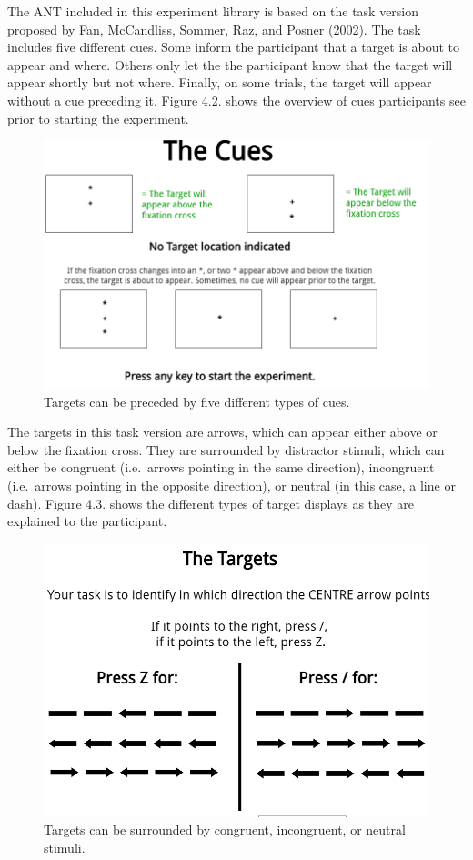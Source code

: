 \documentclass[
]{book}
\begin{document}
The ANT included in this experiment library is based on the task version proposed by Fan, McCandliss, Sommer, Raz, and Posner (2002). The task includes five different cues. Some inform the participant that a target is about to appear and where. Others only let the the participant know that the target will appear shortly but not where. Finally, on some trials, the target will appear without a cue preceding it. Figure 4.2. shows the overview of cues participants see prior to starting the experiment.

\begin{figure}

{\centering \includegraphics[width=0.8\linewidth]{images/ANT_Cues} 

}

\caption{Targets can be preceded by five different types of cues.}\label{fig:Figure3-2}
\end{figure}

The targets in this task version are arrows, which can appear either above or below the fixation cross. They are surrounded by distractor stimuli, which can either be congruent (i.e.~arrows pointing in the same direction), incongruent (i.e.~arrows pointing in the opposite direction), or neutral (in this case, a line or dash). Figure 4.3. shows the different types of target displays as they are explained to the participant.

\begin{figure}

{\centering \includegraphics[width=0.8\linewidth]{images/ANT_Targets} 

}

\caption{Targets can be surrounded by congruent, incongruent, or neutral stimuli.}\label{fig:Figure3-3}
\end{figure}
\end{document}
